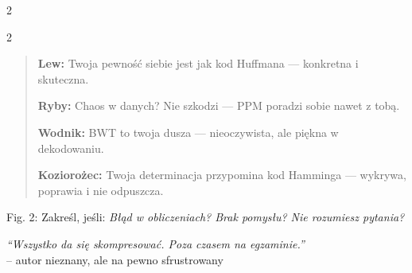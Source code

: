 \documentclass{../konspekt}
\begin{document}
\begin{multicols}{2}
\begin{multicols}{2}
\begin{center}
\begin{center}
      \end{center}
    \end{center}
    \columnbreak
    \begin{quote}
      \textbf{Lew:} Twoja pewność siebie jest jak kod Huffmana —
      konkretna i skuteczna.

      \textbf{Ryby:} Chaos w danych? Nie szkodzi — PPM poradzi sobie
      nawet z tobą.

      \textbf{Wodnik:} BWT to twoja dusza — nieoczywista, ale piękna
      w dekodowaniu.

      \textbf{Koziorożec:} Twoja determinacja przypomina kod Hamminga
      — wykrywa, poprawia i nie odpuszcza.
    \end{quote}

  \end{multicols}

  \begin{center}
    \fbox{\phantom{\rule{1em}{1em}}}
    \fbox{\phantom{\rule{1em}{1em}}}
    \fbox{\phantom{\rule{1em}{1em}}}
    \fbox{\phantom{\rule{1em}{1em}}}
    \fbox{\phantom{\rule{1em}{1em}}}
  \end{center}
  \vspace{-0.8em}
  \begin{center}
    \footnotesize Fig. 2: Zakreśl, jeśli: \textit{Błąd w
    obliczeniach? Brak pomysłu? Nie rozumiesz pytania?}
  \end{center}
  \begin{center}
    \vspace{-0.5em}
    \textit{“Wszystko da się skompresować. Poza czasem na egzaminie.”} \\
    -- autor nieznany, ale na pewno sfrustrowany
  \end{center}
\end{multicols}
\end{document}
